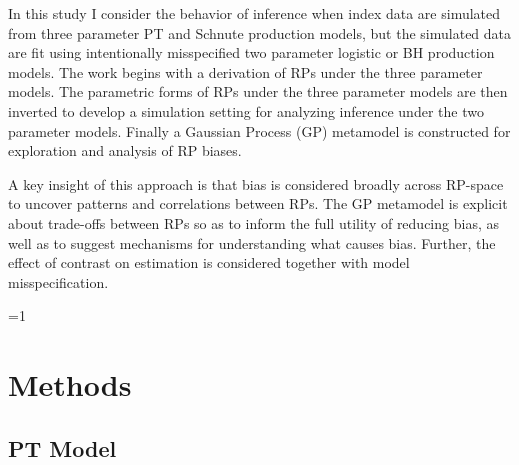 \documentclass[12pt]{article}
\newcounter{alphasect}
\def\alphainsection{0}
\let\oldsection=\section
\def\section{%
  \ifnum\alphainsection=1%
    \addtocounter{alphasect}{1}
  \fi%
\oldsection}%
\begin{document}


In this study I consider the behavior of inference when index data are simulated 
from three parameter PT and Schnute production models, but the simulated data are fit 
using intentionally misspecified two parameter logistic or BH production models.
%
The work begins with a derivation of RPs under the three parameter models. %
The parametric forms of RPs under the three parameter models are then inverted to develop a %
simulation setting for analyzing inference under the two parameter models. %
Finally a Gaussian Process (GP) metamodel  
is constructed for exploration and analysis of RP biases.

%
A key insight of this approach is that bias is considered broadly across RP-space to
uncover patterns and correlations between RPs. %
The GP metamodel is explicit about trade-offs between RPs %
so as to inform the full utility of reducing bias, as well as to suggest mechanisms for
understanding what causes bias. Further, the effect of contrast on estimation
is considered together with model misspecification. %

%
\section{Methods \label{meth}}

%
\subsection{PT Model}
\end{document}

